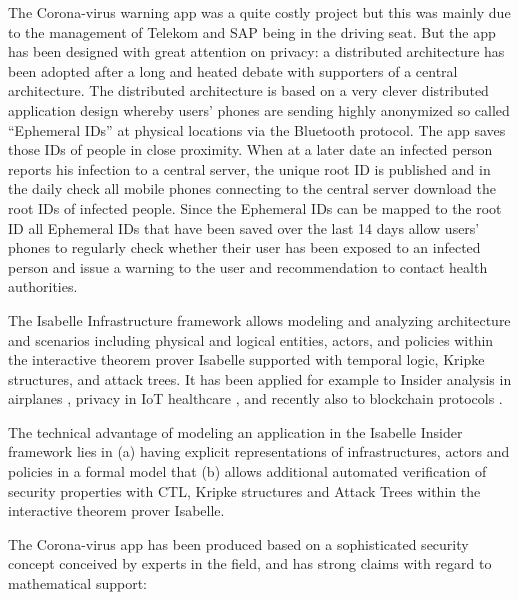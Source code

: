\documentclass{llncs}
\begin{document}
The Corona-virus warning app
was a quite costly project but this was mainly due to the management of
Telekom and SAP being in the driving seat. But the app has been designed with great
attention on privacy:  a distributed architecture \cite{} has been adopted after a long and
heated debate with supporters of a central architecture. The distributed architecture is
based on a very clever distributed application design whereby users' phones are sending
highly anonymized so called ``Ephemeral IDs'' at physical locations via the Bluetooth
protocol. The app saves those IDs of people in close proximity. When at a later date an
infected person reports his infection to a central server, the unique root ID is published
and in the daily check all mobile phones connecting to the central server download
the root IDs of infected people. Since the Ephemeral IDs can be mapped to the root ID
all Ephemeral IDs that have been saved over the last 14 days allow users' phones to
regularly check whether their user has been exposed to an infected person and issue
a warning to the user and recommendation to contact health authorities.

The Isabelle Infrastructure framework \cite{kam:20a} allows modeling and analyzing
architecture and scenarios including physical and logical entities, actors, and policies
within the interactive theorem prover Isabelle supported with temporal logic, Kripke
structures, and attack trees. It has been applied for example to Insider analysis in
airplanes \cite{kam:20b}, privacy in IoT healthcare \cite{kam:18b}, and recently also
to blockchain protocols \cite{kn:20}.

The technical advantage of modeling an application in the Isabelle Insider framework lies
in (a) having explicit representations of infrastructures, actors and policies in a
formal model that (b) allows additional automated verification of security properties
with CTL, Kripke structures and Attack Trees within the interactive theorem prover
Isabelle.

The Corona-virus app has been produced based on a sophisticated security
concept conceived by experts in the field, %
%
and has strong claims with regard to mathematical support:
\end{document}
